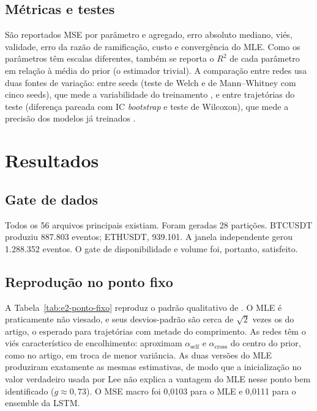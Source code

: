 \documentclass[12pt,a4paper,openany]{report}
\begin{document}
\section{Métricas e testes}

São reportados MSE por parâmetro e agregado, erro absoluto mediano, viés, validade,
erro da razão de ramificação, custo e convergência do MLE. Como os parâmetros têm
escalas diferentes, também se reporta o \(R^2\) de cada parâmetro em relação à média
do prior (o estimador trivial). A comparação entre redes usa duas fontes de variação:
entre seeds (teste de Welch e de Mann--Whitney com cinco seeds), que mede a
variabilidade do treinamento \citep{bouthillier2021}, e entre trajetórias do teste
(diferença pareada com IC \emph{bootstrap} e teste de Wilcoxon), que mede a precisão
dos modelos já treinados \citep{efron1993,diebold1995}.

\chapter{Resultados}
\label{cap:resultados}

\section{Gate de dados}

Todos os 56 arquivos principais existiam. Foram geradas 28 partições. BTCUSDT produziu
887.803 eventos; ETHUSDT, 939.101. A janela independente gerou 1.288.352 eventos.
O gate de disponibilidade e volume foi, portanto, satisfeito.

\section{Reprodução no ponto fixo}



A Tabela~\ref{tab:e2-ponto-fixo} reproduz o padrão qualitativo de \citet{lee2023}.
O MLE é praticamente não viesado, e seus desvios-padrão são cerca de
\(\sqrt{2}\) vezes os do artigo, o esperado para trajetórias com metade do
comprimento. As redes têm o viés característico de encolhimento: aproximam
\(\alpha_{\mathrm{self}}\) e \(\alpha_{\mathrm{cross}}\) do centro do prior, como no
artigo, em troca de menor variância. As duas versões do MLE produziram exatamente as
mesmas estimativas, de modo que a inicialização no valor verdadeiro usada por Lee não
explica a vantagem do MLE nesse ponto bem identificado (\(g\approx0{,}73\)). O MSE
macro foi 0,0103 para o MLE e 0,0111 para o ensemble da LSTM.
\end{document}
